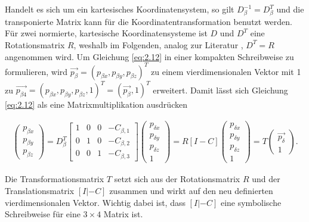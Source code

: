 Handelt es sich um ein kartesisches Koordinatensystem, so gilt $\ensuremath{D_\beta^{-1}}=D_\beta^{T}$ und die transponierte Matrix kann für die Koordinatentransformation benutzt werden. Für zwei normierte, kartesische Koordinatensysteme ist $D$ und $D^T$ eine Rotationsmatrix $R$, weshalb im Folgenden, analog zur Literatur \cite{HZ,Elements,Ferid}, $D^T=R$ angenommen wird.  Um Gleichung \ref{eq:2.12} in einer kompakten Schreibweise zu formulieren, wird $\overrightarrow{p_{\beta}}=(p_{\beta x},p_{\beta y},p_{\beta z})^T$ zu einem vierdimensionalen Vektor mit 1 zu $\overrightarrow{p_{\beta4}}=(p_{\beta x},p_{\beta y},p_{\beta z},1)^T=(\overrightarrow{p_{\beta}},1)^T$ erweitert. Damit lässt sich Gleichung \ref{eq:2.12} als eine Matrixmultiplikation ausdrücken

\begin{gather}
	\begin{pmatrix}
		p_{\beta x}\\p_{\beta y}\\ p_{\beta z}
	\end{pmatrix}
	= D_\beta^T	
	\begin{bmatrix}1 & 0 & 0 & - C_{\beta,1}\\
		0 & 1 & 0& - C_{\beta,2}\\
		0 & 0 & 1 & - C_{\beta,3}
	\end{bmatrix} 
	\begin{pmatrix}
		p_{\delta x}\\p_{\delta y}\\ p_{\delta z}\\1
	\end{pmatrix}
	= R	[I -C] 	 \begin{pmatrix}
		p_{\delta x}\\p_{\delta y}\\ p_{\delta z}\\1
	\end{pmatrix}
	= T	\begin{pmatrix}
		\vec{p_\delta}\\1
	\end{pmatrix}.	 \label{eq:trafo}
\end{gather}

Die Transformationsmatrix $T$ setzt sich aus der Rotationsmatrix $R$ und der Translationsmatrix  $[I |-C]$ zusammen und wirkt auf den neu definierten vierdimensionalen Vektor. Wichtig dabei ist, dass $[I| -C]$ eine symbolische Schreibweise für eine $3 \times 4$ Matrix ist.   



